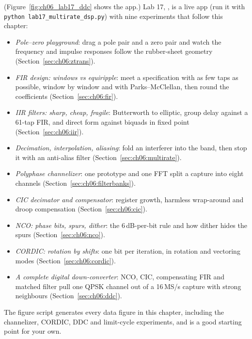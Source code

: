 \begin{labbox}[title=Lab: filters and multirate]
(Figure~\ref{fig:ch06_lab17_ddc} shows the app.)
Lab 17, , is a live app (run it with
\texttt{python lab17\_multirate\_dsp.py}) with nine experiments that follow this chapter:
\begin{itemize}
\item \emph{Pole--zero playground}: drag a pole pair and a zero pair and watch the frequency and
impulse responses follow the rubber-sheet geometry (Section~\ref{sec:ch06:ztrans}).
\item \emph{FIR design: windows vs equiripple}: meet a specification with as few taps as possible,
window by window and with Parks--McClellan, then round the coefficients (Section~\ref{sec:ch06:fir}).
\item \emph{IIR filters: sharp, cheap, fragile}: Butterworth to elliptic, group delay against a 61-tap
FIR, and direct form against biquads in fixed point (Section~\ref{sec:ch06:iir}).
\item \emph{Decimation, interpolation, aliasing}: fold an interferer into the band, then stop it with
an anti-alias filter (Section~\ref{sec:ch06:multirate}).
\item \emph{Polyphase channelizer}: one prototype and one FFT split a capture into eight channels
(Section~\ref{sec:ch06:filterbanks}).
\item \emph{CIC decimator and compensator}: register growth, harmless wrap-around and droop
compensation (Section~\ref{sec:ch06:cic}).
\item \emph{NCO: phase bits, spurs, dither}: the 6\,dB-per-bit rule and how dither hides the spurs
(Section~\ref{sec:ch06:nco}).
\item \emph{CORDIC: rotation by shifts}: one bit per iteration, in rotation and vectoring modes
(Section~\ref{sec:ch06:cordic}).
\item \emph{A complete digital down-converter}: NCO, CIC, compensating FIR and matched filter pull one
QPSK channel out of a 16\,MS/s capture with strong neighbours (Section~\ref{sec:ch06:ddc}).
\end{itemize}
The figure script  generates every data figure in this chapter,
including the channelizer, CORDIC, DDC and limit-cycle experiments, and is a good starting point for
your own.
\end{labbox}


